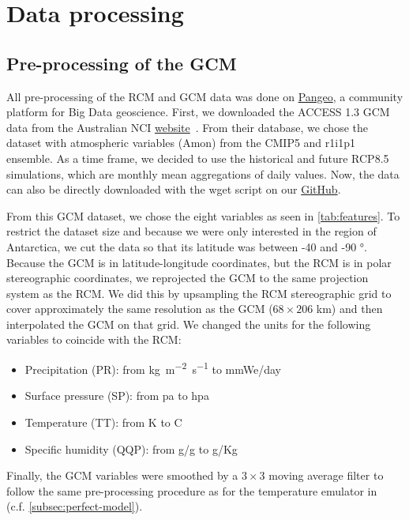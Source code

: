 \documentclass[a4paper,11pt,oneside]{report}
\begin{document}
\cleardoublepage
{}
{}
\printbibliography
\appendix

\chapter{Data processing}

\section{Pre-processing of the GCM}\label{sec:preproc-GCM}

All pre-processing of the RCM and GCM data was done on \href{https://pangeo.io/about.html}{Pangeo}, a community platform for Big Data geoscience. First, we downloaded the ACCESS 1.3 GCM data from the Australian NCI \href{https://esgf.nci.org.au/search/esgf-nci/}{website}~\cite{NCI}. From their database, we chose the dataset with atmospheric variables (Amon) from the CMIP5 and r1i1p1 ensemble. As a time frame, we decided to use the historical and future RCP8.5 simulations, which are monthly mean aggregations of daily values. Now, the data can also be directly downloaded with the wget script on our \href{https://github.com/marvande/master-thesis}{GitHub}. 

From this GCM dataset, we chose the eight variables as seen in \autoref{tab:features}. To restrict the dataset size and because we were only interested in the region of Antarctica, we cut the data so that its latitude was between -40 and -90 $\si{\degree}$. Because the GCM is in latitude-longitude coordinates, but the RCM is in polar stereographic coordinates, we reprojected the GCM to the same projection system as the RCM. We did this by upsampling the RCM stereographic grid to cover approximately the same resolution as the GCM ($68 \times 206$ \si{km}) and then interpolated the GCM on that grid. We changed the units for the following variables to coincide with the RCM: 
\begin{itemize}
        \item Precipitation (PR): from \si{kg m^{-2}s^{-1}} to \si{mmWe/day}
        \item Surface pressure (SP): from \si{pa} to \si{hpa}
        \item Temperature (TT): from \si{K} to \si{C}
        \item Specific humidity (QQP): from \si{g/g} to \si{g/Kg}
    \end{itemize}
Finally, the GCM variables were smoothed by a $3\times3$ moving average filter to follow the same pre-processing procedure as for the temperature emulator in~\cite{Doury} (c.f. \autoref{subsec:perfect-model}). 
\end{document}
